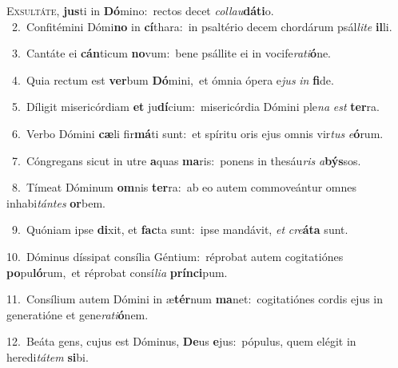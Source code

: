 \lettrine{\initial\textcolor{\initialcolor}{E}}{xsultáte,} \textbf{jus}\-ti in \textbf{Dó}\-mino:~\star rectos decet \textit{col}\-\textit{lau}\textbf{dá}\textbf{ti}o.\\
{\numbfont\textcolor{\numbcolor}{~2.}}~Confitémini Dómi\textbf{no} in \textbf{cí}\-thara:~\star in psaltério decem chordárum psál\-\textit{li}\-\textit{te} \textbf{il}\-li.\par
{\numbfont\textcolor{\numbcolor}{~3.}}~Cantáte ei \textbf{cán}\-ticum \textbf{no}\-vum:~\star bene psállite ei in vocife\-\textit{ra}\-\textit{ti}\textbf{ó}ne.\par
{\numbfont\textcolor{\numbcolor}{~4.}}~Quia rectum est \textbf{ver}\-bum \textbf{Dó}\-mini,~\star et ómnia ópera e\textit{jus} \textit{in} \textbf{fi}\-de.\par
{\numbfont\textcolor{\numbcolor}{~5.}}~Díligit misericórdiam \textbf{et} ju\-\textbf{dí}\-cium:~\star misericórdia Dómini ple\textit{na} \textit{est} \textbf{ter}\-ra.\par
{\numbfont\textcolor{\numbcolor}{~6.}}~Verbo Dómini \textbf{cæ}\-li fir\-\textbf{má}\-ti sunt:~\star et spíritu oris ejus omnis vir\textit{tus} \textit{e}\-\textbf{ó}rum.\par
{\numbfont\textcolor{\numbcolor}{~7.}}~Cóngregans sicut in utre \textbf{a}\-quas \textbf{ma}\-ris:~\star ponens in thesáu\textit{ris} \textit{a}\-\textbf{býs}sos.\par
{\numbfont\textcolor{\numbcolor}{~8.}}~Tímeat Dóminum \textbf{om}\-nis \textbf{ter}\-ra:~\star ab eo autem commoveántur omnes inhabi\-\textit{tán}\-\textit{tes} \textbf{or}\-bem.\par
{\numbfont\textcolor{\numbcolor}{~9.}}~Quóniam ipse \textbf{di}\-xit, et \textbf{fac}\-ta sunt:~\star ipse mandávit, \textit{et} \textit{cre}\-\textbf{á}\textbf{ta} sunt.\par
{\numbfont\textcolor{\numbcolor}{10.}}~Dóminus díssipat consília Géntium:~\dagger réprobat autem cogitatiónes \textbf{po}\-pu\-\textbf{ló}\-rum,~\star et réprobat consí\-\textit{li}\-\textit{a} \textbf{prín}\-\textbf{ci}pum.\par
{\numbfont\textcolor{\numbcolor}{11.}}~Consílium autem Dómini in æ\-\textbf{tér}\-num \textbf{ma}\-net:~\star cogitatiónes cordis ejus in generatióne et gene\-\textit{ra}\-\textit{ti}\textbf{ó}nem.\par
{\numbfont\textcolor{\numbcolor}{12.}}~Beáta gens, cujus est Dóminus, \textbf{De}\-us \textbf{e}\-jus:~\star pópulus, quem elégit in heredi\-\textit{tá}\-\textit{tem} \textbf{si}\-bi.\par
